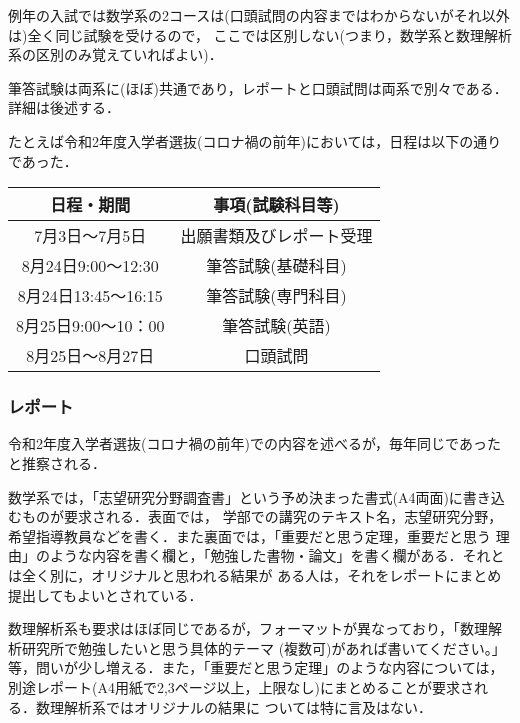 \documentclass[uplatex]{jsarticle}
\begin{document}
例年の入試では数学系の2コースは(口頭試問の内容まではわからないがそれ以外は)全く同じ試験を受けるので，
ここでは区別しない(つまり，数学系と数理解析系の区別のみ覚えていればよい)．

筆答試験は両系に(ほぼ)共通であり，レポートと口頭試問は両系で別々である．詳細は後述する．

たとえば令和2年度入学者選抜(コロナ禍の前年)においては，日程は以下の通りであった．

\begin{table}[h]
\begin{center}
	\begin{tabular}{|c|c|} \hline
		日程・期間 & 事項(試験科目等) \\ \hline \hline
		7月3日～7月5日 & 出願書類及びレポート受理 \quad \\ \hline
		8月24日9:00～12:30 &\quad 筆答試験(基礎科目) \quad \\ \hline
		8月24日13:45～16:15 &\quad 筆答試験(専門科目) \quad \\ \hline
		8月25日9:00～10：00 &\quad 筆答試験(英語) \quad \\ \hline
		8月25日～8月27日 &  口頭試問 \quad \\ \hline
	\end{tabular}
\end{center}
\end{table}

\subsubsection*{レポート}
令和2年度入学者選抜(コロナ禍の前年)での内容を述べるが，毎年同じであったと推察される．

数学系では，「志望研究分野調査書」という予め決まった書式(A4両面)に書き込むものが要求される．表面では，
学部での講究のテキスト名，志望研究分野，希望指導教員などを書く．また裏面では，「重要だと思う定理，重要だと思う
理由」のような内容を書く欄と，「勉強した書物・論文」を書く欄がある．それとは全く別に，オリジナルと思われる結果が
ある人は，それをレポートにまとめ提出してもよいとされている．

数理解析系も要求はほぼ同じであるが，フォーマットが異なっており，「数理解析研究所で勉強したいと思う具体的テーマ
(複数可)があれば書いてください。」等，問いが少し増える．また，「重要だと思う定理」のような内容については，
別途レポート(A4用紙で2,3ページ以上，上限なし)にまとめることが要求される．数理解析系ではオリジナルの結果に
ついては特に言及はない．
\end{document}
